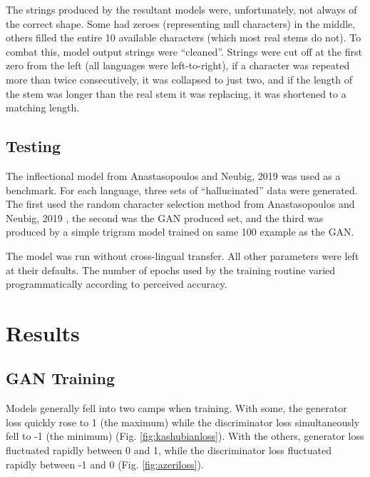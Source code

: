 \documentclass{article}
\begin{document}
      The strings produced by the resultant models were, unfortunately, not always of the correct shape. Some had zeroes (representing null characters) in the middle, others filled the entire 10 available characters (which most real stems do not). To combat this, model output strings were ``cleaned''. Strings were cut off at the first zero from the left (all languages were left-to-right), if a character was repeated more than twice consecutively, it was collapsed to just two, and if the length of the stem was longer than the real stem it was replacing, it was shortened to a matching length. 

    \subsection{Testing}
      The inflectional model from Anastasopoulos and Neubig, 2019 \cite{CMU} was used as a benchmark. For each language, three sets of ``hallucinated'' data were generated. The first used the random character selection method from Anastasopoulos and Neubig, 2019 \cite{CMU}, the second was the GAN produced set, and the third was produced by a simple trigram model trained on same 100 example as the GAN.

      The model was run without cross-lingual transfer. All other parameters were left at their defaults. The number of epochs used by the training routine varied programmatically according to perceived accuracy.

  \section{Results}
    \subsection{GAN Training}
      Models generally fell into two camps when training. With some, the generator loss quickly rose to 1 (the maximum) while the discriminator loss simultaneously fell to -1 (the minimum) (Fig. \ref{fig:kashubianloss}). With the others, generator loss fluctuated rapidly between 0 and 1, while the discriminator loss fluctuated rapidly between -1 and 0 (Fig. \ref{fig:azeriloss}).
\end{document}
